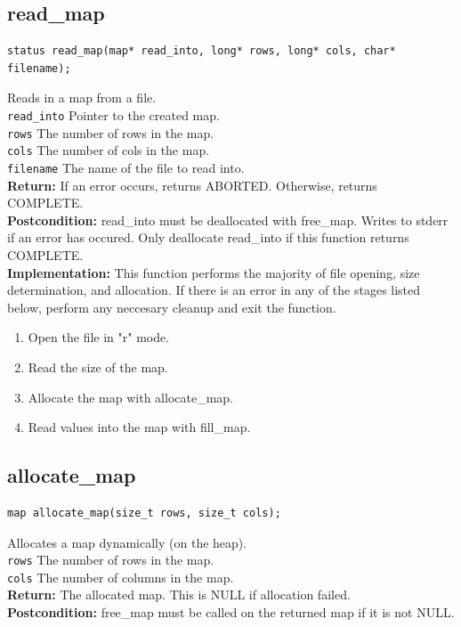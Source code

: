 \documentclass{article}
\begin{document}
\subsection{read\_map}
\begin{lstlisting}
status read_map(map* read_into, long* rows, long* cols, char* filename);
\end{lstlisting}


  Reads in a map from a file.\\ 
 \texttt{read\_into} Pointer to the created map.\\ 
 \texttt{rows} The number of rows in the map.\\ 
 \texttt{cols} The number of cols in the map.\\ 
 \texttt{filename} The name of the file to read into.\\ 
 \textbf{Return:} If an error occurs, returns ABORTED. Otherwise,
     returns COMPLETE.\\ 
 \textbf{Postcondition:}  read\_into must be deallocated with  free\_map.
  Writes to stderr if an error has occured. Only deallocate  read\_into
     if this function returns COMPLETE.\\ 
 
 
 \textbf{Implementation:}
This function performs the majority of file opening, size determination, and allocation.
If there is an error in any of the stages listed below, perform any neccesary cleanup
 and exit the function.
 \begin{enumerate}
\item Open the file in "r" mode.
\item Read the size of the map.
\item Allocate the map with  allocate\_map.
\item Read values into the map with  fill\_map.
\end{enumerate}
 

\subsection{allocate\_map}
\begin{lstlisting}
map allocate_map(size_t rows, size_t cols);
\end{lstlisting}


  Allocates a map dynamically (on the heap).\\ 
 \texttt{rows} The number of rows in the map.\\ 
 \texttt{cols} The number of columns in the map.\\ 
 \textbf{Return:} The allocated map. This is NULL if allocation failed.\\ 
 \textbf{Postcondition:}  free\_map must be called on the returned map if it is not NULL.\\ 
 
\end{document}
